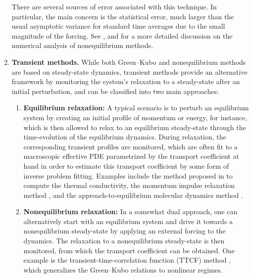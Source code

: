 \begin{enumerate}
   There are several sources of error associated with this technique. In particular, the main concern is the statistical error, much larger than the usual asymptotic variance for standard time averages due to the small magnitude of the forcing. See \cite[Section 5]{acta_numerica2016}, \cite[Section 2]{synthetic2023} and \cite[Section 3]{averages2016} for a more detailed discussion on the numerical analysis of nonequilibrium methods.
   
    \item {\bf Transient methods.} While both Green--Kubo and nonequilibrium methods are based on steady-state dynamics, transient methods provide an alternative framework by monitoring the system’s relaxation to a steady-state after an initial perturbation, and can be classified into two main approaches:
    
    \begin{enumerate}%
        \item {\bf Equilibrium relaxation:} A typical scenario is to perturb an equilibrium system by creating an initial profile of momentum or energy, for instance, which is then allowed to relax to an equilibrium steady-state through the time-evolution of the equilibrium dynamics. During relaxation, the corresponding transient profiles are monitored, which are often fit to a macroscopic effective PDE parametrized by the transport coefficient at hand in order to estimate this transport coefficient by some form of inverse problem fitting. Examples include the method proposed in \cite{hulse2005} to compute the thermal conductivity, the momentum impulse relaxation method \cite{MIR2000}, and the approach-to-equilibrium molecular dynamics method \cite{AEMD2013}.
                
        \item {\bf Nonequilibrium relaxation:} In a somewhat dual approach, one can alternatively start with an equilibrium system and drive it towards a nonequilibrium steady-state by applying an external forcing to the dynamics. The relaxation to a nonequilibrium steady-state is then monitored, from which the transport coefficient can be obtained. One example is the transient-time-correlation function (TTCF) method \cite{TTCF1987,TTCF1988}, which generalizes the Green--Kubo relations to nonlinear regimes.
    \end{enumerate}
\end{enumerate}
%
